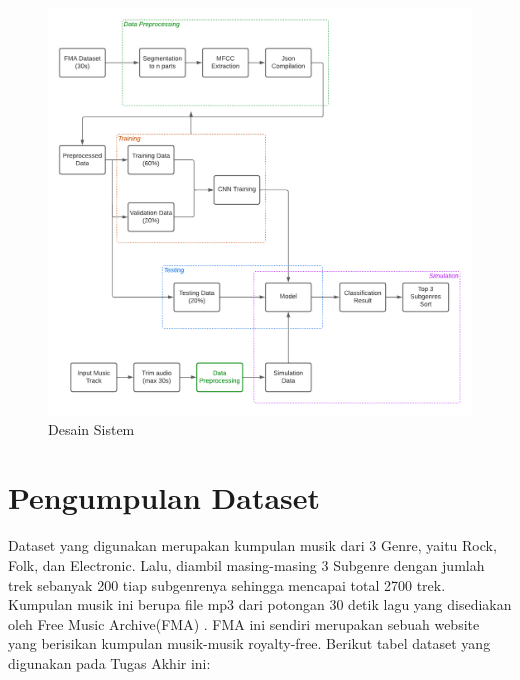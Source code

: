\begin{figure}[b]
	\centering
	
	\includegraphics[width=\textwidth]{gambar/desain sistem2}
	
	\caption{Desain Sistem}
	\label{fig:desainsistem}
\end{figure}



\section{Pengumpulan Dataset}
\label{sec:pengumpulan dataset}

Dataset yang digunakan merupakan kumpulan musik dari 3 Genre, yaitu Rock, Folk, dan Electronic. Lalu, diambil masing-masing 3 Subgenre dengan jumlah trek sebanyak 200 tiap subgenrenya sehingga mencapai total 2700 trek. Kumpulan musik ini berupa file mp3 dari potongan 30 detik lagu yang disediakan oleh Free Music Archive(FMA) \citep{fmadataset}. FMA ini sendiri merupakan sebuah website yang berisikan kumpulan musik-musik royalty-free. Berikut tabel dataset yang digunakan pada Tugas Akhir ini:

